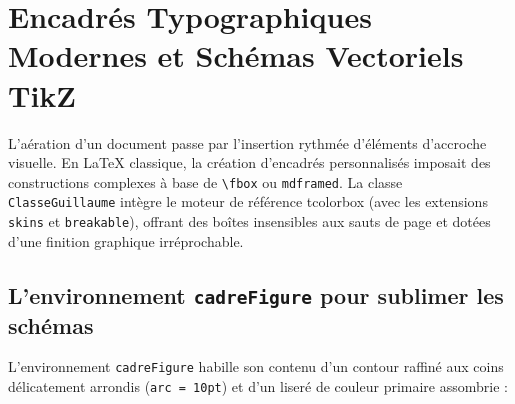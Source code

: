 \section{Encadrés Typographiques Modernes et Schémas Vectoriels TikZ}
\label{sec:boites_tcolorbox_tikz}

L'aération d'un document passe par l'insertion rythmée d'éléments d'accroche visuelle.
En \LaTeX{} classique, la création d'encadrés personnalisés imposait des constructions complexes à base de \texttt{\textbackslash fbox} ou \texttt{mdframed}.
La classe \texttt{ClasseGuillaume} intègre le moteur de référence \textsf{tcolorbox} (avec les extensions \texttt{skins} et \texttt{breakable}), offrant des boîtes insensibles aux sauts de page et dotées d'une finition graphique irréprochable.

\subsection{L'environnement \texttt{cadreFigure} pour sublimer les schémas}
\label{subsec:cadre_figure}

L'environnement \texttt{cadreFigure} habille son contenu d'un contour raffiné aux coins délicatement arrondis (\texttt{arc = 10pt}) et d'un liseré de couleur primaire assombrie :

